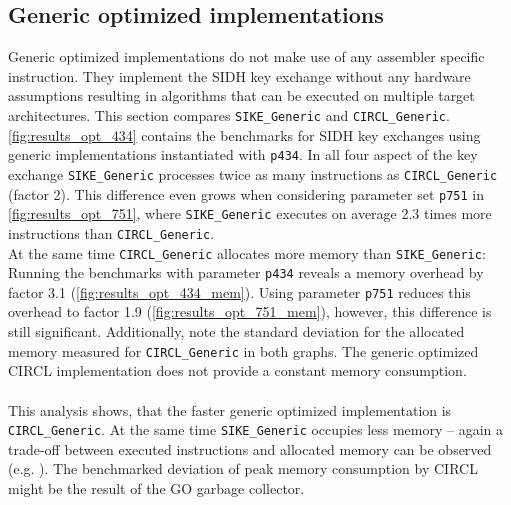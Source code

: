 \subsection{Generic optimized implementations}\label{sec:sike_circl_analysis_generic}
Generic optimized implementations do not make use of any assembler specific instruction. They implement the \gls{SIDH} key exchange without any hardware assumptions resulting in  algorithms that can be executed on multiple target architectures. This section compares \texttt{SIKE\_Generic} and \texttt{CIRCL\_Generic}.\\
\autoref{fig:results_opt_434} contains the benchmarks for \gls{SIDH} key exchanges using generic implementations instantiated with \texttt{p434}.  In all four aspect of the key exchange \texttt{SIKE\_Generic} processes twice as many instructions as \texttt{CIRCL\_Generic} (factor 2). This difference even grows when considering parameter set \texttt{p751} in \autoref{fig:results_opt_751}, where \texttt{SIKE\_Generic} executes on average 2.3 times more instructions than \texttt{CIRCL\_Generic}.\\
At the same time \texttt{CIRCL\_Generic} allocates more memory than \texttt{SIKE\_Generic}: Running the benchmarks with parameter \texttt{p434} reveals a memory overhead by factor 3.1 (\autoref{fig:results_opt_434_mem}). Using parameter \texttt{p751} reduces this overhead to factor 1.9 (\autoref{fig:results_opt_751_mem}), however, this difference is still significant. Additionally, note the standard deviation for the allocated memory measured for \texttt{CIRCL\_Generic} in both graphs. The generic optimized \gls{CIRCL} implementation does not provide a constant memory consumption.
\\\\
This analysis shows, that the faster generic optimized implementation is \texttt{CIRCL\_Generic}. At the same time \texttt{SIKE\_Generic} occupies less memory -- again a trade-off between executed instructions and allocated memory can be observed (e.g. \parencite{1056220}). The benchmarked deviation of peak memory consumption by \gls{CIRCL} might be the result of the GO garbage collector\parencite{Hudson:GGC}.

